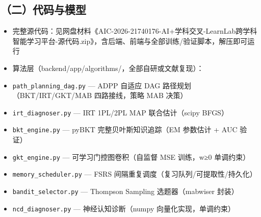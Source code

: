 \documentclass[zihao=-4,a4paper,UTF8,fontset=windows]{ctexart}
\begin{document}
\subsection{（二）代码与模型}
\begin{itemize}[leftmargin=2em,itemsep=0pt,topsep=0pt]
\item 完整源代码：见网盘材料《AIC-2026-21740176-AI+学科交叉-LearnLab跨学科智能学习平台-源代码.zip》，含后端、前端与全部训练/验证脚本，解压即可运行
\end{itemize}
\begin{itemize}[leftmargin=2em,itemsep=0pt,topsep=0pt]
\item 算法层（backend/app/algorithms/，全部自研或文献复现）：
\end{itemize}
\begin{itemize}[leftmargin=2em,itemsep=0pt,topsep=0pt]
\item \texttt{path\_\allowbreak{}planning\_\allowbreak{}dag.\allowbreak{}py} — ADPP 自适应 DAG 路径规划（BKT/IRT/GKT/MAB 四路接线，策略 MAB 决策）
\end{itemize}
\begin{itemize}[leftmargin=2em,itemsep=0pt,topsep=0pt]
\item \texttt{irt\_\allowbreak{}diagnoser.\allowbreak{}py} — IRT 1PL/2PL MAP 联合估计（scipy BFGS）
\end{itemize}
\begin{itemize}[leftmargin=2em,itemsep=0pt,topsep=0pt]
\item \texttt{bkt\_\allowbreak{}engine.\allowbreak{}py} — pyBKT 完整贝叶斯知识追踪（EM 参数估计 + AUC 验证）
\end{itemize}
\begin{itemize}[leftmargin=2em,itemsep=0pt,topsep=0pt]
\item \texttt{gkt\_\allowbreak{}engine.\allowbreak{}py} — 可学习门控图卷积（自监督 MSE 训练，w≥0 单调约束）
\end{itemize}
\begin{itemize}[leftmargin=2em,itemsep=0pt,topsep=0pt]
\item \texttt{memory\_\allowbreak{}scheduler.\allowbreak{}py} — FSRS 间隔重复调度（复习队列/可提取性/持久化）
\end{itemize}
\begin{itemize}[leftmargin=2em,itemsep=0pt,topsep=0pt]
\item \texttt{bandit\_\allowbreak{}selector.\allowbreak{}py} — Thompson Sampling 选题器（mabwiser 封装）
\end{itemize}
\begin{itemize}[leftmargin=2em,itemsep=0pt,topsep=0pt]
\item \texttt{ncd\_\allowbreak{}diagnoser.\allowbreak{}py} — 神经认知诊断（numpy 向量化实现，单调约束）
\end{itemize}
\end{document}
